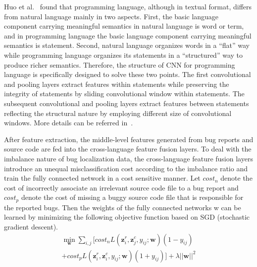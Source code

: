 Huo et al.~\cite{huo2016learning} found that programming language, although in textual format, differs from natural language mainly in two aspects. First, the basic language component carrying meaningful semantics in natural language is word or term, and in programming language the basic language component carrying meaningful semantics is statement. Second, natural language organizes words in a ``flat'' way while programming language organizes its statements in a ``structured'' way to produce richer semantics. Therefore, the structure of CNN for programming language is specifically designed to solve these two points. The first convolutional and pooling layers extract features within statements while preserving the integrity of statements by sliding convolutional window within statements. The subsequent convolutional and pooling layers extract features between statements reflecting the structural nature by employing different size of convolutional windows. More details can be referred in~\cite{huo2016learning}.

After feature extraction, the middle-level features generated from bug reports and source code are fed into the cross-language feature fusion layers. To deal with the imbalance nature of bug localization data, the cross-language feature fusion layers introduce an unequal misclassification cost according to the imbalance ratio and train the fully connected network in a cost sensitive manner. Let $cost_n$ denote the cost of incorrectly associate an irrelevant source code file to a bug report and $cost_p$ denote the cost of missing a buggy source code file that is responsible for the reported bugs. Then the weights of the fully connected networks w can be learned by minimizing the following objective function based on SGD (stochastic gradient descent).
\begin{equation}
\begin{aligned}
\label{eq:cost2}
\mathop{\min}_{\mathbf{w}}\sum_{i,j}{[cost_n L(\mathbf{z}^{r}_i, \mathbf{z}^{c}_j, y_{ij}; \mathbf{w})(1-y_{ij})} \\
 {+cost_p L(\mathbf{z}^{r}_i, \mathbf{z}^{c}_i, y_{ij}; \mathbf{w})(1+y_{ij})]}+\lambda||\mathbf{w}||^2
\end{aligned}
\end{equation}

